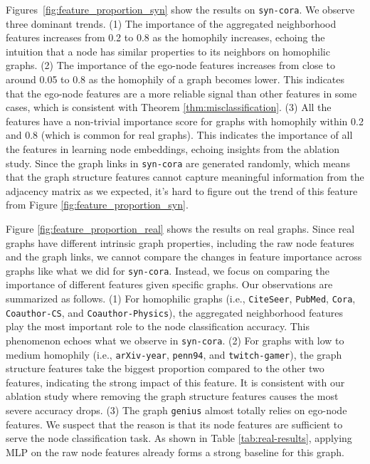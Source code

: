 \documentclass{article}
\theoremstyle{plain}
\begin{document}
Figures~\ref{fig:feature_proportion_syn} show the results on \texttt{syn-cora}. We observe three dominant trends.
(1) The importance of the aggregated neighborhood features increases from 0.2 to 0.8 as the homophily increases, echoing the intuition that a node has similar properties to its neighbors on homophilic graphs.
(2) The importance of the ego-node features increases from close to around 0.05 to 0.8 as the homophily of a graph becomes lower. This indicates that the ego-node features are a more reliable signal than other features in some cases, which is consistent with Theorem \ref{thm:misclassification}. 
(3) All the features have a non-trivial importance score for graphs with homophily within 0.2 and 0.8 (which is common for real graphs). This indicates the importance of all the features in learning node embeddings, echoing insights from the ablation study.
Since the graph links in \texttt{syn-cora} are generated randomly, which means that the graph structure features cannot capture meaningful information from the adjacency matrix as we expected, it's hard to figure out the trend of this feature from Figure \ref{fig:feature_proportion_syn}.

Figure \ref{fig:feature_proportion_real} shows the results on real graphs. 
Since real graphs have different intrinsic graph properties, including the raw node features and the graph links, we cannot compare the changes in feature importance across graphs like what we did for \texttt{syn-cora}. Instead, we focus on comparing the importance of different features given specific graphs. Our observations are summarized as follows.
(1) For homophilic graphs (i.e., \texttt{CiteSeer}, \texttt{PubMed}, \texttt{Cora}, \texttt{Coauthor-CS}, and \texttt{Coauthor-Physics}), the aggregated neighborhood features play the most important role to the node classification accuracy. This phenomenon echoes what we observe in \texttt{syn-cora}.
(2) For graphs with low to medium homophily (i.e., \texttt{arXiv-year}, \texttt{penn94}, and \texttt{twitch-gamer}), the graph structure features take the biggest proportion compared to the other two features, indicating the strong impact of this feature. It is consistent with our ablation study where removing the graph structure features causes the most severe accuracy drops.
(3) The graph \texttt{genius} almost totally relies on ego-node features. We suspect that the reason is that its node features are sufficient to serve the node classification task. 
As shown in Table \ref{tab:real-results}, applying MLP on the raw node features already forms a strong baseline for this graph. 
\end{document}
